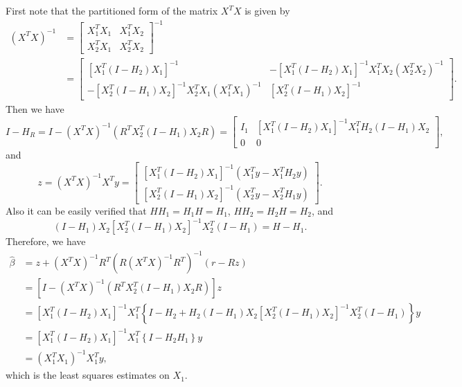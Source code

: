 First note that the partitioned form of the matrix $X^T X$ is given by
\begin{equation}
\begin{aligned}
(X^T X)^{-1} &= 
\begin{bmatrix}
X_1^T X_1 & X_1^T X_2 \\
X_2^T X_1 & X_2^T X_2
\end{bmatrix}^{-1} \\
&=
\begin{bmatrix}
[X_1^T (I-H_2) X_1 ]^{-1} & - [X_1^T (I-H_2) X_1 ]^{-1} X_1^T X_2 (X_2^T X_2)^{-1}\\
- [X_2^T (I-H_1) X_2 ]^{-1} X_2^T X_1 (X_1^T X_1)^{-1} & [X_2^T (I-H_1) X_2 ]^{-1}
\end{bmatrix}.
\end{aligned}
\end{equation}
Then we have
\begin{equation*}
I - H_R=
I - (X^T X)^{-1}(R^T X_2^T (I-H_1) X_2 R) =
\begin{bmatrix}
I_1 & [X_1^T (I-H_2) X_1 ]^{-1} X_1^T H_2 (I-H_1) X_2 \\
0 & 0
\end{bmatrix},
\end{equation*}
and
\begin{equation*}
z = (X^T X)^{-1} X^T y = 
\begin{bmatrix}
[X_1^T (I-H_2) X_1 ]^{-1} (X_1^T y - X_1^T H_2 y)\\
[X_2^T (I-H_1) X_2 ]^{-1} (X_2^T y - X_2^T H_1 y)
\end{bmatrix}.
\end{equation*}
Also it can be easily verified that $HH_1=H_1H=H_1$, $HH_2=H_2H=H_2$, and
\begin{equation*}
(I-H_1)X_2 [X_2^T (I-H_1) X_2 ]^{-1} X_2^T (I-H_1) = H - H_1.
\end{equation*}
Therefore, we have
\begin{equation*}
\begin{aligned}
  \hat{\beta} &= z + (X^T X)^{-1} R^T ( R(X^T X)^{-1} R^T)^{-1} (r-R z) \\
  &= \left[ I
   - (X^T X)^{-1}(R^T X_2^T (I-H_1) X_2 R) \right] z\\
  &= [X_1^T (I-H_2) X_1 ]^{-1} X_1^T \left\{ I-H_2+H_2(I-H_1)X_2 [X_2^T (I-H_1) X_2 ]^{-1} X_2^T (I-H_1)  \right\}y \\
  &= [X_1^T (I-H_2) X_1 ]^{-1} X_1^T \left\{ I-H_2H_1 \right\}y\\
  &= (X_1^T X_1)^{-1} X_1^T y,
\end{aligned}
\end{equation*}
which is the least squares estimates on $X_1$.

